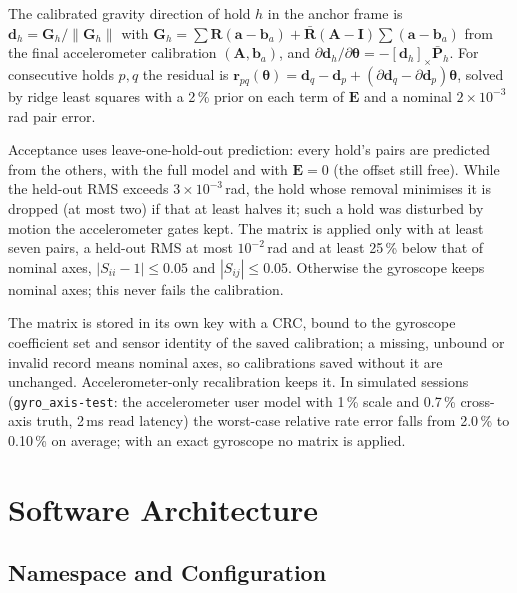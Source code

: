 \documentclass[conference]{IEEEtran}
\begin{document}
    The calibrated gravity direction of hold $h$ in the anchor frame is
    $\mathbf{d}_h = \mathbf{G}_h/\|\mathbf{G}_h\|$ with
    $\mathbf{G}_h = \sum\mathbf{R}(\mathbf{a}-\mathbf{b}_a)
    + \bar{\mathbf{R}}(\mathbf{A}-\mathbf{I})\sum(\mathbf{a}-\mathbf{b}_a)$
    from the final accelerometer calibration $(\mathbf{A},\mathbf{b}_a)$,
    and $\partial\mathbf{d}_h/\partial\boldsymbol{\theta} =
    -[\mathbf{d}_h]_\times\bar{\mathbf{P}}_h$. For consecutive holds $p,q$
    the residual is
    $\mathbf{r}_{pq}(\boldsymbol{\theta}) = \mathbf{d}_q - \mathbf{d}_p
    + (\partial\mathbf{d}_q - \partial\mathbf{d}_p)\boldsymbol{\theta}$,
    solved by ridge least squares with a 2\,\% prior on each term of
    $\mathbf{E}$ and a nominal $2\times10^{-3}$\,rad pair error.

    Acceptance uses leave-one-hold-out prediction: every hold's pairs are
    predicted from the others, with the full model and with $\mathbf{E}=0$
    (the offset still free). While the held-out RMS exceeds
    $3\times10^{-3}$\,rad, the hold whose removal minimises it is dropped
    (at most two) if that at least halves it; such a hold was disturbed by
    motion the accelerometer gates kept. The matrix is applied only with at
    least seven pairs, a held-out RMS at most $10^{-2}$\,rad and at least
    25\,\% below that of nominal axes, $|S_{ii}-1|\le0.05$ and
    $|S_{ij}|\le0.05$. Otherwise the gyroscope keeps nominal axes; this
    never fails the calibration.

    The matrix is stored in its own key with a CRC, bound to the gyroscope
    coefficient set and sensor identity of the saved calibration; a missing,
    unbound or invalid record means nominal axes, so calibrations saved
    without it are unchanged. Accelerometer-only recalibration keeps it.
    In simulated sessions (\texttt{gyro\_axis-test}: the accelerometer user
    model with 1\,\% scale and 0.7\,\% cross-axis truth, 2\,ms read
    latency) the worst-case relative rate error falls from 2.0\,\% to
    0.10\,\% on average; with an exact gyroscope no matrix is applied.

    \section{Software Architecture}
    \label{sec:arch}

    \subsection{Namespace and Configuration}
\end{document}
